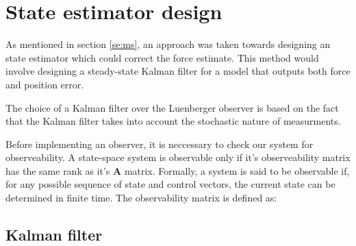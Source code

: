 \section{State estimator design}
As mentioned in section \ref{se:ms}, an approach was taken towards designing an state estimator which could correct the force estimate.
This method would involve designing a steady-state Kalman filter \cite{brown1997introduction} for a model that outputs both force and position error.

The choice of a Kalman filter over the Luenberger observer \cite{friedland2012control} is based on the fact that the Kalman filter takes into account the stochastic nature of measurments.

Before implementing an observer, it is neccessary to check our system for observeability.
A state-space system is observable only if it's observeability matrix has the same rank as it's $\mathbf{A}$ matrix.
Formally, a system is said to be observable if, for any possible sequence of state and control vectors, the current state can be determined in finite time.
The observability matrix is defined as:





\subsection{Kalman filter }

